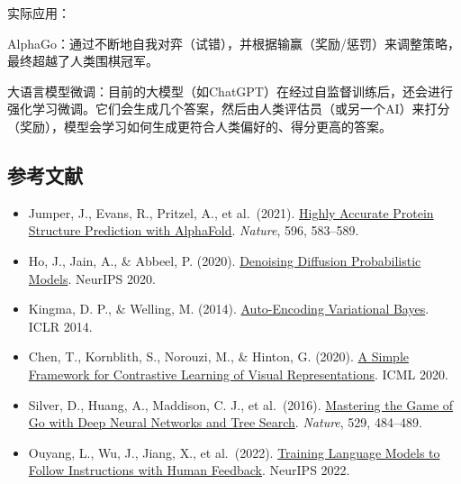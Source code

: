 实际应用：

AlphaGo：通过不断地自我对弈（试错），并根据输赢（奖励/惩罚）来调整策略，最终超越了人类围棋冠军。

大语言模型微调：目前的大模型（如ChatGPT）在经过自监督训练后，还会进行强化学习微调。它们会生成几个答案，然后由人类评估员（或另一个AI）来打分（奖励），模型会学习如何生成更符合人类偏好的、得分更高的答案。

\FloatBarrier
{}
\hypertarget{ux53c2ux8003ux6587ux732e}{%
\subsection{参考文献}\label{ux53c2ux8003ux6587ux732e}}

\vspace{0.25em}
\begin{itemize}
\tightlist
\item
  Jumper, J., Evans, R., Pritzel, A., et al.~(2021). \href{https://www.nature.com/articles/s41586-021-03819-2}{Highly Accurate Protein Structure Prediction with AlphaFold}. \emph{Nature}, 596, 583--589.
\item
  Ho, J., Jain, A., \& Abbeel, P. (2020). \href{https://proceedings.neurips.cc/paper/2020/hash/4c5bcfec8584af0d967f1ab10179ca4b-Abstract.html}{Denoising Diffusion Probabilistic Models}. NeurIPS 2020.
\item
  Kingma, D. P., \& Welling, M. (2014). \href{https://arxiv.org/abs/1312.6114}{Auto-Encoding Variational Bayes}. ICLR 2014.
\item
  Chen, T., Kornblith, S., Norouzi, M., \& Hinton, G. (2020). \href{https://proceedings.mlr.press/v119/chen20j.html}{A Simple Framework for Contrastive Learning of Visual Representations}. ICML 2020.
\item
  Silver, D., Huang, A., Maddison, C. J., et al.~(2016). \href{https://doi.org/10.1038/nature16961}{Mastering the Game of Go with Deep Neural Networks and Tree Search}. \emph{Nature}, 529, 484--489.
\item
  Ouyang, L., Wu, J., Jiang, X., et al.~(2022). \href{https://arxiv.org/abs/2203.02155}{Training Language Models to Follow Instructions with Human Feedback}. NeurIPS 2022.
\end{itemize}

\clearpage

